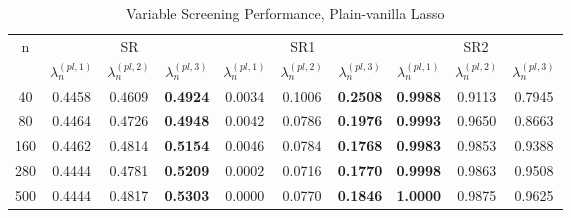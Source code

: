 \documentclass[12pt,a4paper]{article}
\begin{document}
\begin{landscape}
\begin{table}[]\center
\caption{Variable Screening Performance, Plain-vanilla Lasso}
\label{tab:3}
\begin{tabular}{cccccccccc}
\hline
\multicolumn{1}{|c|}{\multirow{2}{*}{n}} & \multicolumn{3}{c|}{SR}                                                                          & \multicolumn{3}{c|}{SR1}                                                                         & \multicolumn{3}{c|}{SR2}                                                                         \\
\multicolumn{1}{|c|}{}                   & $ \lambda_n^{(pl, 1)} $ & $ \lambda_n^{(pl, 2)} $ & \multicolumn{1}{c|}{$ \lambda_n^{(pl, 3)} $} & $ \lambda_n^{(pl, 1)} $ & $ \lambda_n^{(pl, 2)} $ & \multicolumn{1}{c|}{$ \lambda_n^{(pl, 3)} $} & $ \lambda_n^{(pl, 1)} $ & $ \lambda_n^{(pl, 2)} $ & \multicolumn{1}{c|}{$ \lambda_n^{(pl, 3)} $} \\ \hline
\multicolumn{1}{|c|}{40}                 & 0.4458                  & 0.4609                  & \multicolumn{1}{c|}{\textbf{0.4924}}         & 0.0034                  & 0.1006                  & \multicolumn{1}{c|}{\textbf{0.2508}}         & \textbf{0.9988}         & 0.9113                  & \multicolumn{1}{c|}{0.7945}                  \\
\multicolumn{1}{|c|}{80}                 & 0.4464                  & 0.4726                  & \multicolumn{1}{c|}{\textbf{0.4948}}         & 0.0042                  & 0.0786                  & \multicolumn{1}{c|}{\textbf{0.1976}}         & \textbf{0.9993}         & 0.9650                  & \multicolumn{1}{c|}{0.8663}                  \\
\multicolumn{1}{|c|}{160}                & 0.4462                  & 0.4814                  & \multicolumn{1}{c|}{\textbf{0.5154}}         & 0.0046                  & 0.0784                  & \multicolumn{1}{c|}{\textbf{0.1768}}         & \textbf{0.9983}         & 0.9853                  & \multicolumn{1}{c|}{0.9388}                  \\
\multicolumn{1}{|c|}{280}                & 0.4444                  & 0.4781                  & \multicolumn{1}{c|}{\textbf{0.5209}}         & 0.0002                  & 0.0716                  & \multicolumn{1}{c|}{\textbf{0.1770}}         & \textbf{0.9998}         & 0.9863                  & \multicolumn{1}{c|}{0.9508}                  \\
\multicolumn{1}{|c|}{500}                & 0.4444                  & 0.4817                  & \multicolumn{1}{c|}{\textbf{0.5303}}         & 0.0000                  & 0.0770                  & \multicolumn{1}{c|}{\textbf{0.1846}}         & \textbf{1.0000}         & 0.9875                  & \multicolumn{1}{c|}{0.9625}                  \\

\end{tabular}
\end{table}
\end{landscape}
\end{document}
